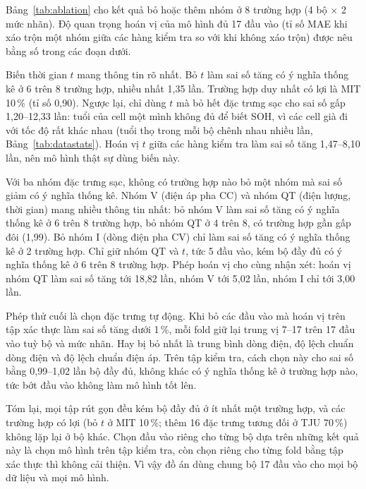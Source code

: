 Bảng~\ref{tab:ablation} cho kết quả bỏ hoặc thêm nhóm ở 8 trường hợp (4 bộ $\times$ 2 mức nhãn). Độ quan trọng hoán vị của mô hình đủ 17 đầu vào (tỉ số MAE khi xáo trộn một nhóm giữa các hàng kiểm tra so với khi không xáo trộn) được nêu bằng số trong các đoạn dưới.

Biến thời gian $t$ mang thông tin rõ nhất. Bỏ $t$ làm sai số tăng có ý nghĩa thống kê ở 6 trên 8 trường hợp, nhiều nhất 1{,}35 lần. Trường hợp duy nhất có lợi là MIT 10\,\% (tỉ số 0{,}90). Ngược lại, chỉ dùng $t$ mà bỏ hết đặc trưng sạc cho sai số gấp 1{,}20--12{,}33 lần: tuổi của cell một mình không đủ để biết SOH, vì các cell già đi với tốc độ rất khác nhau (tuổi thọ trong mỗi bộ chênh nhau nhiều lần, Bảng~\ref{tab:datastats}). Hoán vị $t$ giữa các hàng kiểm tra làm sai số tăng 1{,}47--8{,}10 lần, nên mô hình thật sự dùng biến này.

Với ba nhóm đặc trưng sạc, không có trường hợp nào bỏ một nhóm mà sai số giảm có ý nghĩa thống kê. Nhóm V (điện áp pha CC) và nhóm QT (điện lượng, thời gian) mang nhiều thông tin nhất: bỏ nhóm V làm sai số tăng có ý nghĩa thống kê ở 6 trên 8 trường hợp, bỏ nhóm QT ở 4 trên 8, có trường hợp gần gấp đôi (1{,}99). Bỏ nhóm I (dòng điện pha CV) chỉ làm sai số tăng có ý nghĩa thống kê ở 2 trường hợp. Chỉ giữ nhóm QT và $t$, tức 5 đầu vào, kém bộ đầy đủ có ý nghĩa thống kê ở 6 trên 8 trường hợp. Phép hoán vị cho cùng nhận xét: hoán vị nhóm QT làm sai số tăng tới 18{,}82 lần, nhóm V tới 5{,}02 lần, nhóm I chỉ tới 3{,}00 lần.

Phép thử cuối là chọn đặc trưng tự động. Khi bỏ các đầu vào mà hoán vị trên tập xác thực làm sai số tăng dưới 1\,\%, mỗi fold giữ lại trung vị 7--17 trên 17 đầu vào tuỳ bộ và mức nhãn. Hay bị bỏ nhất là trung bình dòng điện, độ lệch chuẩn dòng điện và độ lệch chuẩn điện áp. Trên tập kiểm tra, cách chọn này cho sai số bằng 0{,}99--1{,}02 lần bộ đầy đủ, không khác có ý nghĩa thống kê ở trường hợp nào, tức bớt đầu vào không làm mô hình tốt lên.

Tóm lại, mọi tập rút gọn đều kém bộ đầy đủ ở ít nhất một trường hợp, và các trường hợp có lợi (bỏ $t$ ở MIT 10\,\%; thêm 16 đặc trưng tương đối ở TJU 70\,\%) không lặp lại ở bộ khác. Chọn đầu vào riêng cho từng bộ dựa trên những kết quả này là chọn mô hình trên tập kiểm tra, còn chọn riêng cho từng fold bằng tập xác thực thì không cải thiện. Vì vậy đồ án dùng chung bộ 17 đầu vào cho mọi bộ dữ liệu và mọi mô hình.

